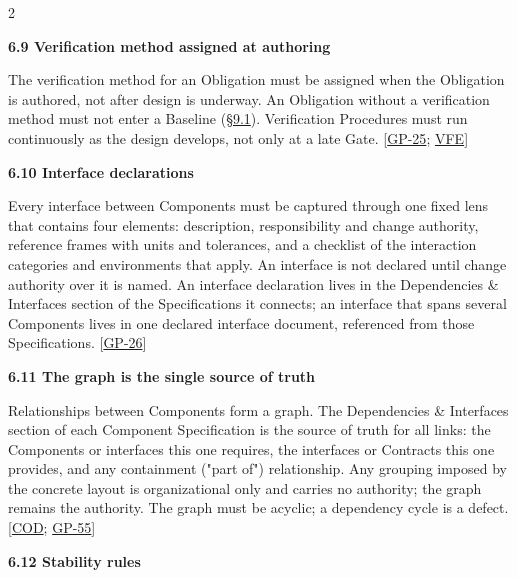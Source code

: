 \begin{multicols}{2}
\par\smallskip\noindent\textbf{6.9 Verification method assigned at authoring}\par\nopagebreak

The verification method for an Obligation must be assigned when the Obligation is authored, not after design is underway. An Obligation without a verification method must not enter a Baseline (\hyperlink{nss-9.1}{\S9.1}). Verification Procedures must run continuously as the design develops, not only at a late Gate. [\hyperlink{gp-25}{GP-25}; \hyperlink{gp-VFE}{VFE}]

\hypertarget{nss-6.10}{}

\par\smallskip\noindent\textbf{6.10 Interface declarations}\par\nopagebreak

Every interface between Components must be captured through one fixed lens that contains four elements: description, responsibility and change authority, reference frames with units and tolerances, and a checklist of the interaction categories and environments that apply. An interface is not declared until change authority over it is named. An interface declaration lives in the Dependencies \& Interfaces section of the Specifications it connects; an interface that spans several Components lives in one declared interface document, referenced from those Specifications. [\hyperlink{gp-26}{GP-26}]

\hypertarget{nss-6.11}{}

\par\smallskip\noindent\textbf{6.11 The graph is the single source of truth}\par\nopagebreak

Relationships between Components form a graph. The Dependencies \& Interfaces section of each Component Specification is the source of truth for all links: the Components or interfaces this one requires, the interfaces or Contracts this one provides, and any containment ("part of") relationship. Any grouping imposed by the concrete layout is organizational only and carries no authority; the graph remains the authority. The graph must be acyclic; a dependency cycle is a defect. [\hyperlink{gp-COD}{COD}; \hyperlink{gp-55}{GP-55}]

\hypertarget{nss-6.12}{}

\par\smallskip\noindent\textbf{6.12 Stability rules}\par\nopagebreak


\end{multicols}
